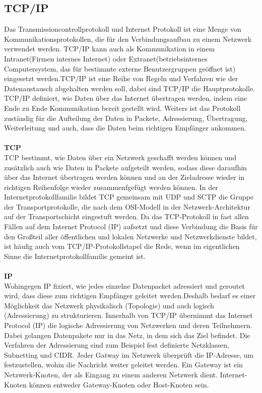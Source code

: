 \documentclass[a4paper,12pt]{article}
\begin{document}
\subsection{TCP/IP}
Das Transmissioncontrollprotokoll und Internet Protokoll ist eine Menge von Kommunikationsprotokollen, die für den Verbindungsaufbau zu einem Netzwerk verwendet werden. TCP/IP kann auch als Kommunikation in einem Intranet(Firmen internes Internet) oder Extranet(betriebsinternes Computersystem, das für bestimmte externe Benutzergruppen geöffnet ist) eingesetzt werden.TCP/IP ist eine Reihe von Regeln und Verfahren wie der Datenaustausch abgehalten werden soll, dabei sind TCP/IP die Hauptprotokolle. TCP/IP definiert, wie Daten über das Internet übertragen werden, indem eine Ende zu Ende Kommunikation bereit gestellt wird. Weiters ist das Protokoll zuständig für die Aufteilung der Daten in Packete, Adressierung, Übertragung, Weiterleitung und auch, dass die Daten beim richtigen Empfänger ankommen.\\\\
\textbf{TCP}\\
TCP bestimmt, wie Daten über ein Netzwerk geschafft werden können und zusätzlich auch wie Daten in Packete aufgeteilt werden, sodass diese daraufhin über das Internet übertragen werden können und an der Zieladresse wieder in richtigen Reihenfolge wieder zusammenfgefügt werden können.
In der Internetprotokollfamilie bildet TCP gemeinsam mit UDP und SCTP die Gruppe der Transportprotokolle, die nach dem OSI-Modell in der Netzwerk-Architektur auf der Transportschicht eingestuft werden. Da das TCP-Protokoll in fast allen Fällen auf dem Internet Protocol (IP) aufsetzt und diese Verbindung die Basis für den Großteil aller öffentlichen und lokalen Netzwerke und Netzwerkdienste bildet, ist häufig auch vom TCP/IP-Protokollstapel die Rede, wenn im eigentlichen Sinne die Internetprotokollfamilie gemeint ist.
\\\\
\textbf{IP}\\
Wohingegen IP fixiert, wie jedes einzelne Datenpacket adressiert und geroutet wird, dass diese zum richtigen Empfänger geleitet werden.Deshalb bedarf es einer Möglichkeit das Netzwerk physikalisch (Topologie) und auch logisch (Adressierung) zu strukturieren. Innerhalb von TCP/IP übernimmt das Internet Protocol (IP) die logische Adressierung von Netzwerken und deren Teilnehmern. Dabei gelangen Datenpakete nur in das Netz, in dem sich das Ziel befindet. Die Verfahren der Adressierung sind zum Beispiel fest definierte Netzklassen, Subnetting und CIDR. Jeder Gatway im Netzwerk überprüft die IP-Adresse, um festzustellen, wohin die Nachricht weiter geleitet werden. Ein Gateway ist ein Netzwerk-Knoten, der als Eingang zu einem anderen Netzwerk dient. Internet-Knoten können entweder Gateway-Knoten oder Host-Knoten sein.\\\\
\end{document}
